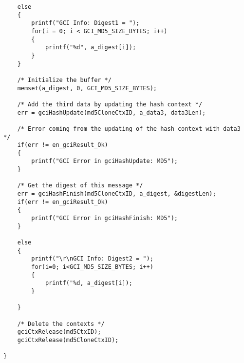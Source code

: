 \begin{lstlisting}
    else
    {
        printf("GCI Info: Digest1 = ");
        for(i = 0; i < GCI_MD5_SIZE_BYTES; i++)
        {
            printf("%d", a_digest[i]);
        }
    }

    /* Initialize the buffer */
    memset(a_digest, 0, GCI_MD5_SIZE_BYTES);

    /* Add the third data by updating the hash context */
    err = gciHashUpdate(md5CloneCtxID, a_data3, data3Len);

    /* Error coming from the updating of the hash context with data3 */
    if(err != en_gciResult_Ok)
    {
        printf("GCI Error in gciHashUpdate: MD5");
    }

    /* Get the digest of this message */
    err = gciHashFinish(md5CloneCtxID, a_digest, &digestLen);
    if(err != en_gciResult_Ok)
    {
        printf("GCI Error in gciHashFinish: MD5");
    }

    else
    {
        printf("\r\nGCI Info: Digest2 = ");
        for(i=0; i<GCI_MD5_SIZE_BYTES; i++)
        {
            printf("%d, a_digest[i]);
        }

    }

    /* Delete the contexts */
    gciCtxRelease(md5CtxID);
    gciCtxRelease(md5CloneCtxID);

}
\end{lstlisting}